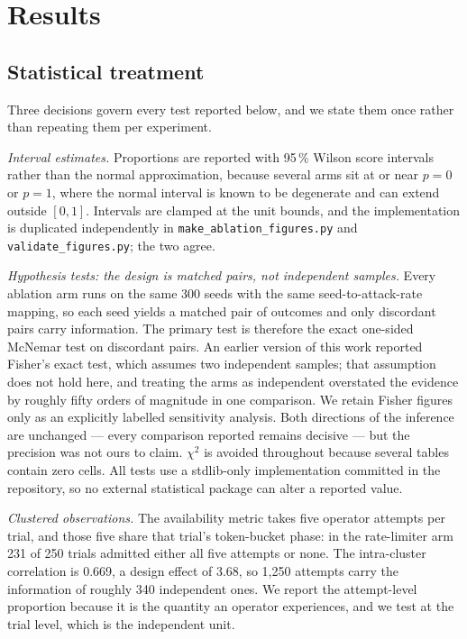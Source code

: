 \section{Results}\label{sec:results}

\subsection{Statistical treatment}\label{sec:stats}

Three decisions govern every test reported below, and we state them once rather than repeating
them per experiment.

\emph{Interval estimates.} Proportions are reported with 95\,\% Wilson score intervals rather
than the normal approximation, because several arms sit at or near $p=0$ or $p=1$, where the
normal interval is known to be degenerate and can extend outside $[0,1]$. Intervals are clamped
at the unit bounds, and the implementation is duplicated independently in
\texttt{make\_ablation\_figures.py} and \texttt{validate\_figures.py}; the two agree.

\emph{Hypothesis tests: the design is matched pairs, not independent samples.} Every ablation arm
runs on the same 300 seeds with the same seed-to-attack-rate mapping, so each seed yields a
matched pair of outcomes and only discordant pairs carry information. The primary test is
therefore the exact one-sided McNemar test on discordant pairs. An earlier version of this work
reported Fisher's exact test, which assumes two independent samples; that assumption does not hold
here, and treating the arms as independent overstated the evidence by roughly fifty orders of
magnitude in one comparison. We retain Fisher figures only as an explicitly labelled sensitivity
analysis. Both directions of the inference are unchanged --- every comparison reported remains
decisive --- but the precision was not ours to claim. $\chi^2$ is avoided throughout because
several tables contain zero cells. All tests use a stdlib-only implementation committed in the
repository, so no external statistical package can alter a reported value.

\emph{Clustered observations.} The availability metric takes five operator attempts per trial, and
those five share that trial's token-bucket phase: in the rate-limiter arm 231 of 250 trials
admitted either all five attempts or none. The intra-cluster correlation is 0.669, a design effect
of 3.68, so 1{,}250 attempts carry the information of roughly 340 independent ones. We report the
attempt-level proportion because it is the quantity an operator experiences, and we test at the
trial level, which is the independent unit.


